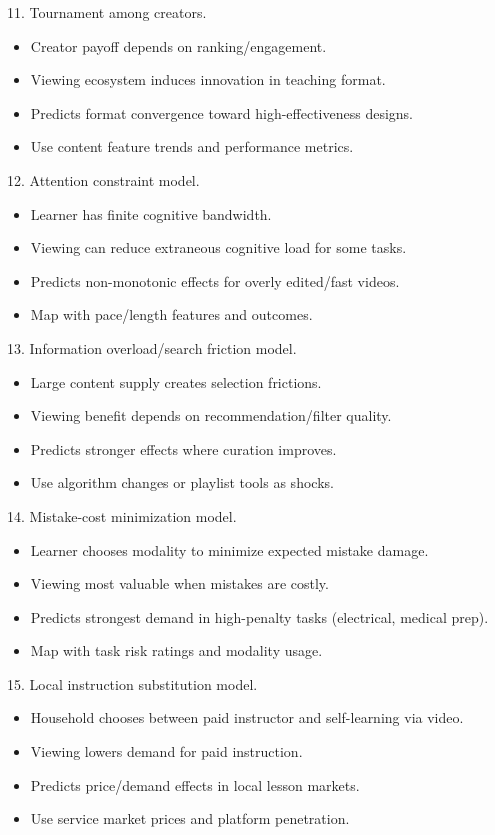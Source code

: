 \documentclass[11pt]{article}
\begin{document}
11. Tournament among creators.\\
\begin{itemize}
\item Creator payoff depends on ranking/engagement.
\item Viewing ecosystem induces innovation in teaching format.
\item Predicts format convergence toward high-effectiveness designs.
\item Use content feature trends and performance metrics.
\end{itemize}

12. Attention constraint model.\\
\begin{itemize}
\item Learner has finite cognitive bandwidth.
\item Viewing can reduce extraneous cognitive load for some tasks.
\item Predicts non-monotonic effects for overly edited/fast videos.
\item Map with pace/length features and outcomes.
\end{itemize}

13. Information overload/search friction model.\\
\begin{itemize}
\item Large content supply creates selection frictions.
\item Viewing benefit depends on recommendation/filter quality.
\item Predicts stronger effects where curation improves.
\item Use algorithm changes or playlist tools as shocks.
\end{itemize}

14. Mistake-cost minimization model.\\
\begin{itemize}
\item Learner chooses modality to minimize expected mistake damage.
\item Viewing most valuable when mistakes are costly.
\item Predicts strongest demand in high-penalty tasks (electrical, medical prep).
\item Map with task risk ratings and modality usage.
\end{itemize}

15. Local instruction substitution model.\\
\begin{itemize}
\item Household chooses between paid instructor and self-learning via video.
\item Viewing lowers demand for paid instruction.
\item Predicts price/demand effects in local lesson markets.
\item Use service market prices and platform penetration.
\end{itemize}
\end{document}
